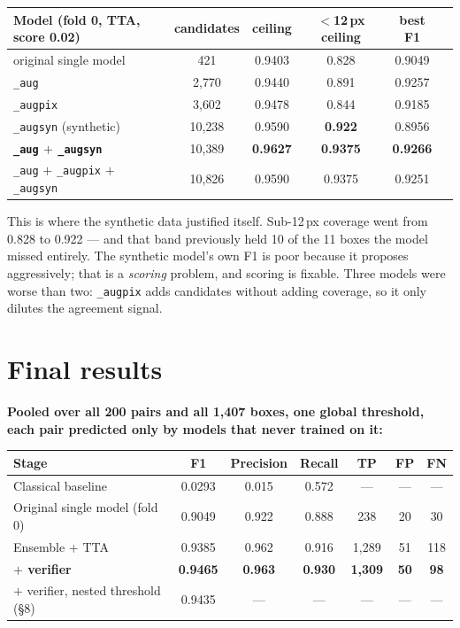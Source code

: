\documentclass[11pt,a4paper]{article}
\begin{document}
\begin{table}[h!]
\centering
\small
\renewcommand{\arraystretch}{1.2}
\begin{tabular}{@{}p{5.0cm}ccccc@{}}
\toprule
\textbf{Model (fold 0, TTA, score 0.02)} & \textbf{candidates} & \textbf{ceiling} & \textbf{$<$12\,px ceiling} & \textbf{best F1} \\
\midrule
original single model & 421 & 0.9403 & 0.828 & 0.9049 \\
\texttt{\_aug} & 2{,}770 & 0.9440 & 0.891 & 0.9257 \\
\texttt{\_augpix} & 3{,}602 & 0.9478 & 0.844 & 0.9185 \\
\texttt{\_augsyn} (synthetic) & 10{,}238 & 0.9590 & \textbf{0.922} & 0.8956 \\
\textbf{\texttt{\_aug} $+$ \texttt{\_augsyn}} & 10{,}389 & \textbf{0.9627} & \textbf{0.9375} & \textbf{0.9266} \\
\texttt{\_aug} $+$ \texttt{\_augpix} $+$ \texttt{\_augsyn} & 10{,}826 & 0.9590 & 0.9375 & 0.9251 \\
\bottomrule
\end{tabular}
\end{table}

This is where the synthetic data justified itself. Sub-12\,px coverage went from 0.828 to 0.922 ---
and that band previously held 10 of the 11 boxes the model missed entirely. The synthetic model's
own F1 is poor because it proposes aggressively; that is a \emph{scoring} problem, and scoring is
fixable. Three models were worse than two: \texttt{\_augpix} adds candidates without adding
coverage, so it only dilutes the agreement signal.

\section{Final results}

\textbf{Pooled over all 200 pairs and all 1{,}407 boxes, one global threshold, each pair predicted
only by models that never trained on it:}

\begin{table}[h!]
\centering
\small
\renewcommand{\arraystretch}{1.25}
\begin{tabular}{@{}lcccccc@{}}
\toprule
\textbf{Stage} & \textbf{F1} & \textbf{Precision} & \textbf{Recall} & \textbf{TP} & \textbf{FP} & \textbf{FN} \\
\midrule
Classical baseline & 0.0293 & 0.015 & 0.572 & --- & --- & --- \\
Original single model (fold 0) & 0.9049 & 0.922 & 0.888 & 238 & 20 & 30 \\
Ensemble + TTA & 0.9385 & 0.962 & 0.916 & 1{,}289 & 51 & 118 \\
\textbf{$+$ verifier} & \textbf{0.9465} & \textbf{0.963} & \textbf{0.930} & \textbf{1{,}309} & \textbf{50} & \textbf{98} \\
$+$ verifier, nested threshold (\S 8) & 0.9435 & --- & --- & --- & --- & --- \\
\bottomrule
\end{tabular}
\end{table}
\end{document}
